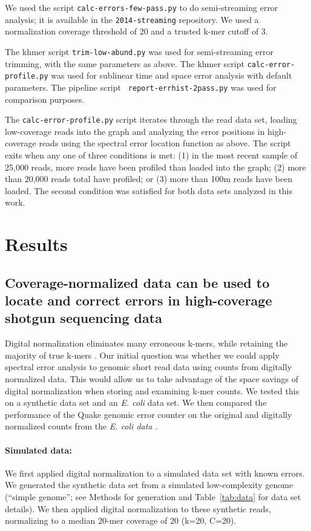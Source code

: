 \documentclass{article}
\begin{document}
We used the script {\tt calc-errors-few-pass.py} to do semi-streaming
error analysis; it is available in the {\tt 2014-streaming}
repository.  We used a normalization coverage threshold of 20 and a trusted
k-mer cutoff of 3.

The khmer script {\tt trim-low-abund.py} was used for semi-streaming
error trimming, with the same parameters as above.  The khmer script
{\tt calc-error-profile.py} was used for sublinear time and space
error analysis with default parameters.  The pipeline script {\tt
  report-errhist-2pass.py} was used for comparison purposes.

The {\tt calc-error-profile.py} script iterates through the read data
set, loading low-coverage reads into the graph and analyzing the error
positions in high-coverage reads using the spectral error location
function as above.  The script exits when any one of three conditions
is met: (1) in the most recent sample of 25,000 reads, more reads have
been profiled than loaded into the graph; (2) more than 20,000 reads
total have profiled; or (3) more than 100m reads have been loaded.
The second condition was satisfied for both data sets analyzed in this
work.

\section{Results}

\subsection{Coverage-normalized data can be used to locate
and correct errors in high-coverage shotgun sequencing data}

Digital normalization eliminates many erroneous k-mers, while
retaining the majority of true k-mers \cite{Brown2012}.  Our initial
question was whether we could apply spectral error analysis to genomic
short read data using counts from digitally normalized data. This
would allow us to take advantage of the space savings of digital
normalization when storing and examining k-mer counts.  We tested this
on a synthetic data set and an {\em E. coli} data set.  We then
compared the performance of the Quake genomic error counter on the
original and digitally normalized counts from the {\em E. coli data}
\cite{quake}.

\paragraph{Simulated data:}
We first applied digital normalization to a simulated data set with
known errors.  We generated the synthetic data set from a simulated
low-complexity genome (``simple genome''; see Methods for generation
and Table~\ref{tab:data} for data set details). We then applied
digital normalization to these synthetic reads, normalizing to a
median 20-mer coverage of 20 (k=20, C=20).
\end{document}
